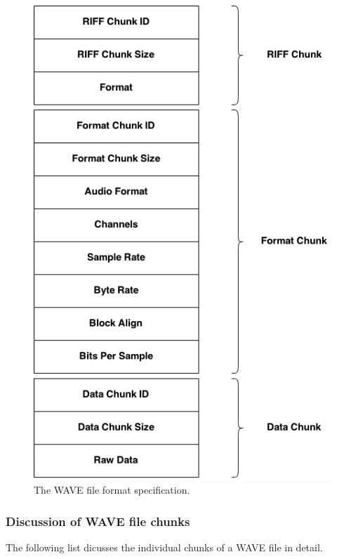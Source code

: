 \documentclass[12pt,twoside]{report}
\begin{document}
\begin{figure}[p!]
  \includegraphics[scale=0.7]{img/wave}
  \caption{The WAVE file format specification.}
  \label{fig:wave}
\end{figure}

\pagebreak

\subsubsection{Discussion of WAVE file chunks}

The following list dicusses the individual chunks of a WAVE file in detail.
\end{document}
